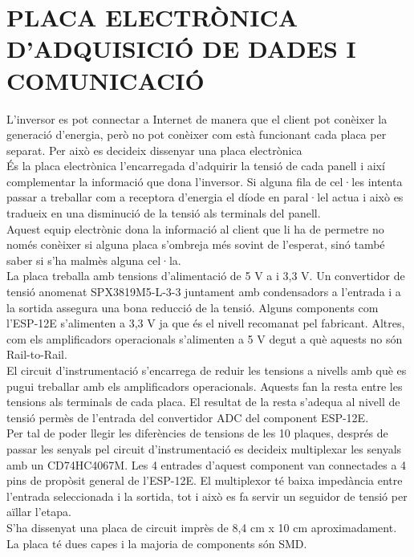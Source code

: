 \chapter{\uppercase{Placa electrònica d'adquisició de dades i comunicació}}

L'inversor es pot connectar a Internet de manera que el client pot conèixer la generació d'energia, però no pot conèixer com està funcionant cada placa per separat. Per això es decideix dissenyar una placa electrònica\\
\newline És la placa electrònica l'encarregada d'adquirir la tensió de cada panell i així complementar la informació que dona l'inversor. Si alguna fila de cel·les intenta passar a treballar com a receptora d'energia el díode en paral·lel actua i això es tradueix en una disminució de la tensió als terminals del panell.\\
\newline Aquest equip electrònic dona la informació al client que li ha de permetre no només conèixer si alguna placa s'ombreja més sovint de l'esperat, sinó també saber si s'ha malmès alguna cel·la.\\
\newline La placa treballa amb tensions d'alimentació de 5 V a i 3,3 V. Un convertidor de tensió anomenat SPX3819M5-L-3-3 juntament amb condensadors a l'entrada i a la sortida assegura una bona reducció de la tensió. Alguns components com l'ESP-12E s'alimenten a 3,3 V ja que és el nivell recomanat pel fabricant. Altres, com els amplificadors operacionals s'alimenten a 5 V degut a què aquests no són Rail-to-Rail.\\
\newline El circuit d'instrumentació s'encarrega de reduir les tensions a nivells amb què es pugui treballar amb els amplificadors operacionals. Aquests fan la resta entre les tensions als terminals de cada placa. El resultat de la resta s'adequa al nivell de tensió permès de l'entrada del convertidor ADC del component ESP-12E.\\
\newline Per tal de poder llegir les diferències de tensions de les 10 plaques, després de passar les senyals pel circuit d'instrumentació es decideix multiplexar les senyals amb un CD74HC4067M. Les 4 entrades d'aquest component van connectades a 4 pins de propòsit general de l'ESP-12E. El multiplexor té baixa impedància entre l'entrada seleccionada i la sortida, tot i això es fa servir un seguidor de tensió per aïllar l'etapa.\\
\newline S'ha dissenyat una placa de circuit imprès de 8,4 cm x 10 cm aproximadament. La placa té dues capes i la majoria de components són SMD.



\clearpage



